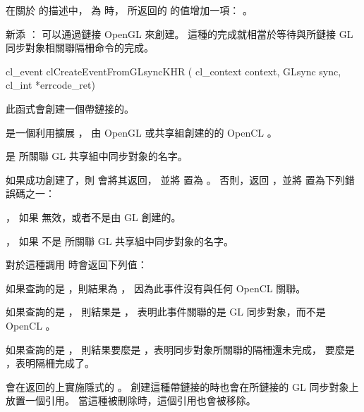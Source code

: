 在關於  的描述中，
 為  時，
所返回的  的值增加一項： 。

新添{} {}：
\startreplacepar
可以通過鏈接 OpenGL {}來創建。
這種的完成就相當於等待與所鏈接 GL 同步對象相關聯隔柵命令的完成。


\startCLFUNC
cl_event clCreateEventFromGLsyncKHR (
			cl_context context,
			GLsync sync,
			cl_int *errcode_ret)
\stopCLFUNC

此函式會創建一個帶鏈接的。

 是一個利用擴展 ，
由 OpenGL 或共享組創建的的 OpenCL 。

 是  所關聯 GL 共享組中同步對象的名字。

如果成功創建了，則  會將其返回，
並將  置為 。
否則，返回 ，並將  置為下列錯誤碼之一：
\startigBase
\item {}，
如果  無效，或者不是由 GL 創建的。

\item {}，
如果  不是  所關聯 GL 共享組中同步對象的名字。
\stopigBase

對於這種調用  時會返回下列值：
\startigBase
\item 如果查詢的是 ，則結果為 ，
因為此事件沒有與任何 OpenCL 關聯。

\item 如果查詢的是 ，
則結果是 ，
表明此事件關聯的是 GL 同步對象，而不是 OpenCL 。

\item 如果查詢的是 ，
則結果要麼是 ，表明同步對象所關聯的隔柵還未完成，
要麼是 ，表明隔柵完成了。
\stopigBase

 會在返回的上實施隱式的 。
創建這種帶鏈接的時也會在所鏈接的 GL 同步對象上放置一個引用。
當這種被刪除時，這個引用也會被移除。

